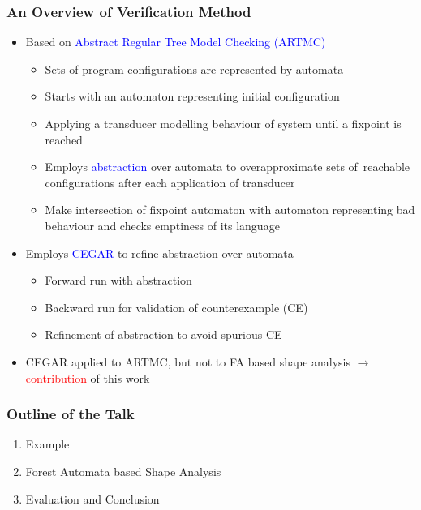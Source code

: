 \documentclass{beamer}
\newcommand{\hlbl}[1]{\textcolor{blue}{#1}}
\newcommand{\hlrd}[1]{\textcolor{red}{#1}}
\begin{document}
\begin{frame}
  \frametitle{An Overview of Verification Method}
   \begin{itemize}
	   \item Based on \hlbl{Abstract Regular Tree Model Checking (ARTMC)} 
		\begin{itemize}
			\item Sets of program configurations are represented by automata
			\item Starts with an automaton representing initial configuration
			\item Applying a transducer modelling behaviour of system until a fixpoint is reached
			\item Employs \hlbl{abstraction} over automata to overapproximate sets of~reachable configurations
				after each application of transducer
			\item Make intersection of fixpoint automaton with automaton representing bad behaviour and
				checks emptiness of its language
		\end{itemize}
		\pause
	   \item Employs \hlbl{CEGAR} to refine abstraction over automata
		   \begin{itemize}
			    \item Forward run with abstraction
			    \item Backward run for validation of counterexample (CE)
				\item Refinement of abstraction to avoid spurious CE
		   \end{itemize}
		\pause
	   \item CEGAR applied to ARTMC, but not to FA
		   based shape analysis $\rightarrow$ \hlrd{contribution} of this work
  \end{itemize}
\end{frame}

\begin{frame}
\frametitle{Outline of the Talk}

	\begin{enumerate}
		\item Example
		\item Forest Automata based Shape Analysis
		\item Evaluation and Conclusion
	\end{enumerate}

\end{frame}
\end{document}
